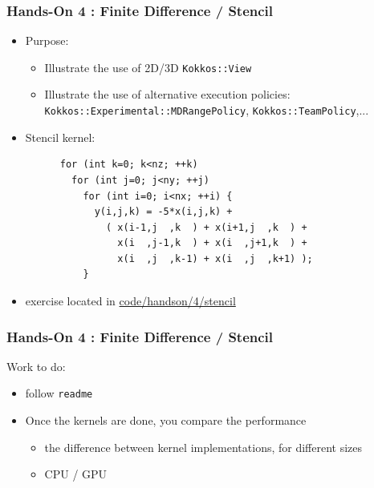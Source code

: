 \begin{frame}[fragile=singleslide]
  \frametitle{Hands-On 4 : Finite Difference / Stencil}

  \hypertarget{handson4}{}

  \begin{itemize}
  \item Purpose:
    \begin{itemize}
    \item Illustrate the use of 2D/3D \texttt{Kokkos::View}
    \item Illustrate the use of alternative execution policies: \texttt{Kokkos::Experimental::MDRangePolicy}, \texttt{Kokkos::TeamPolicy},...
    \end{itemize}
  \item Stencil kernel:
    \begin{verbatim}
      for (int k=0; k<nz; ++k)
        for (int j=0; j<ny; ++j)
          for (int i=0; i<nx; ++i) {
            y(i,j,k) = -5*x(i,j,k) +
              ( x(i-1,j  ,k  ) + x(i+1,j  ,k  ) +
                x(i  ,j-1,k  ) + x(i  ,j+1,k  ) +
                x(i  ,j  ,k-1) + x(i  ,j  ,k+1) );
          }
    \end{verbatim}
  \item exercise located in \url{code/handson/4/stencil}
  \end{itemize}
  
\end{frame}

\begin{frame}[fragile=singleslide]
  \frametitle{Hands-On 4 : Finite Difference / Stencil}

  Work to do:
  \begin{itemize}
  \item follow \texttt{readme}
  \item Once the kernels are done, you compare the performance
    \begin{itemize}
    \item the difference between kernel implementations, for different sizes
    \item CPU / GPU
    \end{itemize}
  \end{itemize}
  
\end{frame}

